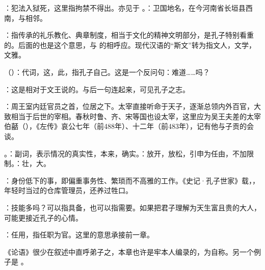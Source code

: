 {
\item {}：犯法入狱死，这里指拘禁不得出。亦见于 。：卫国地名，在今河南省长垣县西南，与相邻。%
\item {}：指传承的礼乐教化、典章制度，相当于文化的精神文明部分，是孔子特别看重的。后面的也是这个意思，与  的相呼应。现代汉语的“斯文”转为指文人，文学，文雅。
\item {}（）：代词，这，此，指孔子自己。这是一个反问句：难道……吗？
\item {}：这是相对于文王说的。与后一句连起来，可见孔子之志。
}
{}


{
\item {}：周王室内廷官员之首，位居之下。太宰直接听命于天子，逐渐总领内外百官，大致相当于后世的宰相。春秋时鲁、齐、宋等国也设太宰，这里应为吴王夫差的太宰伯嚭（），《左传》哀公七年（前488年）、十二年（前483年），记有他与子贡的会谈。
\item {}。：副词，表示情况的真实性，本来，确实。：放开，放松，引申为任由，不加限制。：壮，大。
\item {}：身份低下的事，即偏重事务性、繁琐而不高雅的工作。《史记·孔子世家》载，，年轻时当过的仓库管理员，还养过牲口。
\item {}：技能多吗？可以指具备，也可以指需要。如果把君子理解为天生富且贵的大人，可能更接近孔子的心情。
}
{}


{
\begin{lyblobitemize}
\item {}：任用，指任职为官。这里的意思承接前一章。
\end{lyblobitemize}
《论语》很少在叙述中直呼弟子之，本章也许是牢本人编录的，为自称。另一个例子是  。
}
{}


